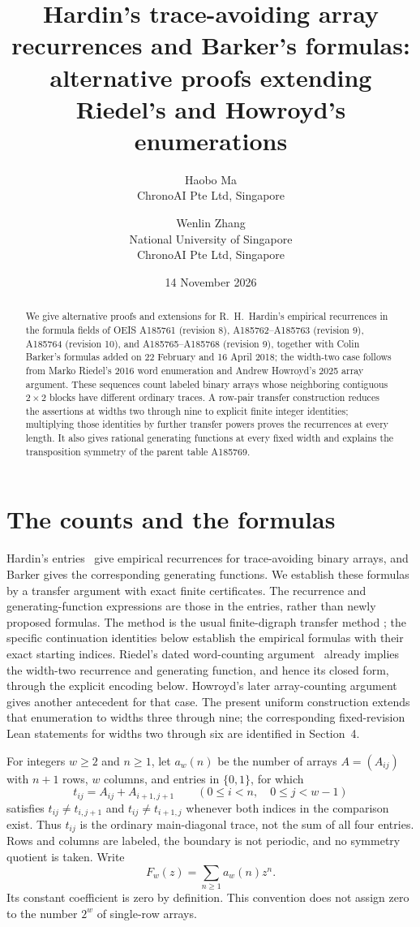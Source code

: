 \documentclass[11pt]{article}
\title{Hardin's trace-avoiding array recurrences and Barker's formulas:\\
alternative proofs extending Riedel's and Howroyd's enumerations}
\author{Haobo Ma\\\small ChronoAI Pte Ltd, Singapore
\and Wenlin Zhang\\\small National University of Singapore\\
\small ChronoAI Pte Ltd, Singapore}
\date{14 November 2026}
\begin{document}
\maketitle
\begin{abstract}
We give alternative proofs and extensions for R.\ H.\ Hardin's empirical recurrences in the formula fields of
OEIS A185761 (revision 8), A185762--A185763 (revision 9), A185764
(revision 10), and A185765--A185768 (revision 9), together with Colin
Barker's formulas added on 22 February and 16 April 2018; the width-two
case follows from Marko Riedel's 2016 word enumeration and Andrew
Howroyd's 2025 array argument.
These sequences count labeled binary arrays whose neighboring contiguous
$2\times2$ blocks have different ordinary traces.
A row-pair transfer construction reduces the assertions at widths two
through nine to explicit finite integer identities; multiplying those
identities by further transfer powers proves the recurrences at every
length. It also gives rational generating functions at every fixed width
and explains the transposition symmetry of the parent table A185769.
\end{abstract}

\section{The counts and the formulas}
Hardin's entries~\cite{oeis2,oeis3,oeis4,oeis5,oeis6,oeis7,oeis8,oeis9} give empirical recurrences for
trace-avoiding binary arrays, and Barker gives the corresponding generating
functions. We establish these formulas by a transfer argument with exact
finite certificates. The recurrence and generating-function expressions
are those in the entries, rather than newly proposed formulas.
The method is the usual finite-digraph transfer method
\cite[Theorems 4.7.1--4.7.2]{stanley}; the specific continuation identities
below establish the empirical formulas with their exact starting indices.
Riedel's dated word-counting argument~\cite{riedel} already implies the
width-two recurrence and generating function, and hence its closed form,
through the explicit encoding below. Howroyd's later array-counting
argument~\cite{howroyd} gives another antecedent for that case.
The present uniform construction
extends that enumeration to widths three through nine; the corresponding
fixed-revision Lean statements for widths two through six are identified
in Section~4.

For integers $w\ge2$ and $n\ge1$, let $a_w(n)$ be the number of arrays
$A=(A_{ij})$ with $n+1$ rows, $w$ columns, and entries in $\{0,1\}$, for which
\[
 t_{ij}=A_{ij}+A_{i+1,j+1}\qquad(0\le i<n,\quad 0\le j<w-1)
\]
satisfies $t_{ij}\ne t_{i,j+1}$ and $t_{ij}\ne t_{i+1,j}$ whenever both
indices in the comparison exist. Thus $t_{ij}$ is the ordinary
main-diagonal trace, not the sum of all four entries. Rows and columns are
labeled, the boundary is not periodic, and no symmetry quotient is taken.
Write
\[
 F_w(z)=\sum_{n\ge1}a_w(n)z^n.
\]
Its constant coefficient is zero by definition. This convention does not
assign zero to the number $2^w$ of single-row arrays.
\end{document}
